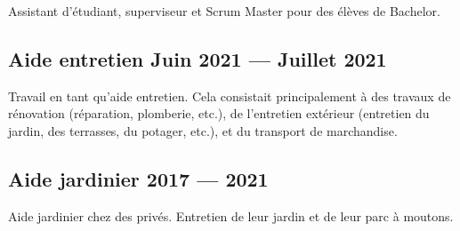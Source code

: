 Assistant d'étudiant, superviseur et Scrum Master pour des élèves de Bachelor.

\vspace{0.35\baselineskip}

\subsection{Aide entretien \hfill Juin 2021 --- Juillet 2021}
\vspace{0.7\baselineskip}

Travail en tant qu'aide entretien. Cela consistait principalement à des travaux de rénovation (réparation, plomberie,
etc.), de l'entretien extérieur (entretien du jardin, des terrasses, du potager, etc.), et du transport de
marchandise.


\vspace{0.35\baselineskip}

\subsection{Aide jardinier \hfill 2017 --- 2021}
\vspace{0.7\baselineskip}

Aide jardinier chez des privés. Entretien de leur jardin et de leur parc à moutons.

\vspace{0.35\baselineskip}



